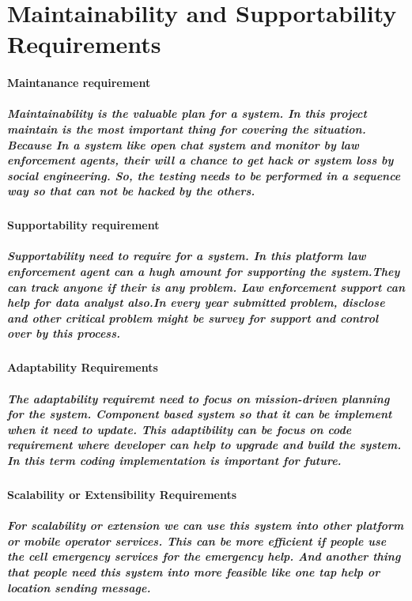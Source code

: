 \documentclass{article}
\begin{document}
\newpage
\section{Maintainability and Supportability Requirements}
\paragraph{Maintanance requirement}
\subparagraph{Maintainability is the valuable plan for a system. In this project maintain is the most important thing for covering the situation.
Because In a system like open chat system and monitor by law enforcement agents, their will a chance to get hack or system loss by social engineering.
So, the testing needs to be performed in a sequence way so that can not be hacked by the others.}

\paragraph{Supportability requirement}
\subparagraph{Supportability need to require for a system. In this platform law enforcement agent can a hugh amount for supporting the system.They can track anyone if their is any problem.
Law enforcement support can help for data analyst also.In every year submitted problem, disclose and other critical problem might be survey for support and control over by this process.}

\paragraph{Adaptability Requirements}
\subparagraph{The adaptability requiremt need to focus on mission-driven planning for the system. Component based system so that 
it can be implement when it need to update. This adaptibility can be focus on code requirement where developer can help to upgrade and build the system. In this term coding implementation is important for future.}
\paragraph{Scalability or Extensibility Requirements}
\subparagraph{For scalability or extension we can use this system into other platform or mobile operator services. This can be more efficient if people use the cell emergency services for the emergency help. And another thing that people need this system into more feasible like one tap help or location sending message.}


\newpage
\end{document}
